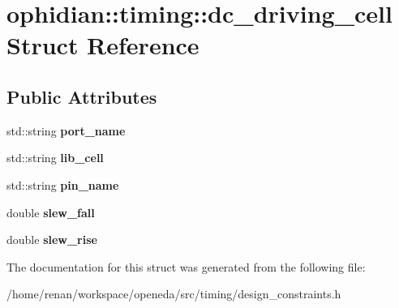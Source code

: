 \hypertarget{structophidian_1_1timing_1_1dc__driving__cell}{\section{ophidian\-:\-:timing\-:\-:dc\-\_\-driving\-\_\-cell Struct Reference}
\label{structophidian_1_1timing_1_1dc__driving__cell}
}
\subsection*{Public Attributes}
\begin{DoxyCompactItemize}
\item 
\hypertarget{structophidian_1_1timing_1_1dc__driving__cell_aa262b8b165b70c9fc7486cd9b7e15073}{std\-::string {\bfseries port\-\_\-name}}\label{structophidian_1_1timing_1_1dc__driving__cell_aa262b8b165b70c9fc7486cd9b7e15073}

\item 
\hypertarget{structophidian_1_1timing_1_1dc__driving__cell_ab5e6a3d6be3b3ade1f127c0548c0de60}{std\-::string {\bfseries lib\-\_\-cell}}\label{structophidian_1_1timing_1_1dc__driving__cell_ab5e6a3d6be3b3ade1f127c0548c0de60}

\item 
\hypertarget{structophidian_1_1timing_1_1dc__driving__cell_ad421f3dc1d7a87522d4fa57cb6002bc2}{std\-::string {\bfseries pin\-\_\-name}}\label{structophidian_1_1timing_1_1dc__driving__cell_ad421f3dc1d7a87522d4fa57cb6002bc2}

\item 
\hypertarget{structophidian_1_1timing_1_1dc__driving__cell_aed437762142625c7a297d9aab09e7eab}{double {\bfseries slew\-\_\-fall}}\label{structophidian_1_1timing_1_1dc__driving__cell_aed437762142625c7a297d9aab09e7eab}

\item 
\hypertarget{structophidian_1_1timing_1_1dc__driving__cell_a264e5487e7ade7e9eb3fa889d5c2912f}{double {\bfseries slew\-\_\-rise}}\label{structophidian_1_1timing_1_1dc__driving__cell_a264e5487e7ade7e9eb3fa889d5c2912f}

\end{DoxyCompactItemize}


The documentation for this struct was generated from the following file\-:\begin{DoxyCompactItemize}
\item 
/home/renan/workspace/openeda/src/timing/design\-\_\-constraints.\-h\end{DoxyCompactItemize}
